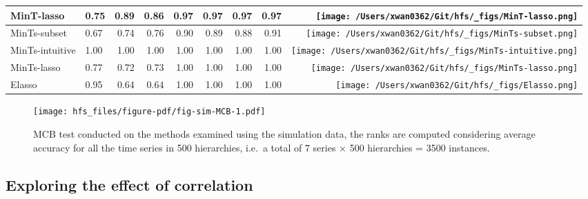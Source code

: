 \documentclass[
  letterpaper,
  DIV=11,
  numbers=noendperiod]{scrartcl}
\begin{document}
\begin{table}[!h]
{\begin{tabular}{llrrrrrr>{}r}
MinT-lasso & 0.75 & 0.89 & 0.86 & 0.97 & 0.97 & 0.97 & 0.97 & \texttt{[image: /Users/xwan0362/Git/hfs/\_figs/MinT-lasso.png]}\\
\midrule
MinTs-subset & 0.67 & 0.74 & 0.76 & 0.90 & 0.89 & 0.88 & 0.91 & \texttt{[image: /Users/xwan0362/Git/hfs/\_figs/MinTs-subset.png]}\\
MinTs-intuitive & 1.00 & 1.00 & 1.00 & 1.00 & 1.00 & 1.00 & 1.00 & \texttt{[image: /Users/xwan0362/Git/hfs/\_figs/MinTs-intuitive.png]}\\
MinTs-lasso & 0.77 & 0.72 & 0.73 & 1.00 & 1.00 & 1.00 & 1.00 & \texttt{[image: /Users/xwan0362/Git/hfs/\_figs/MinTs-lasso.png]}\\
\midrule
Elasso & 0.95 & 0.64 & 0.64 & 1.00 & 1.00 & 1.00 & 1.00 & \texttt{[image: /Users/xwan0362/Git/hfs/\_figs/Elasso.png]}\\
\bottomrule
\end{tabular}}
\end{table}

\begin{figure}

{\centering \texttt{[image: hfs\_files/figure-pdf/fig-sim-MCB-1.pdf]}

}

\caption{\label{fig-sim-MCB}MCB test conducted on the methods examined
using the simulation data, the ranks are computed considering average
accuracy for all the time series in 500 hierarchies, i.e.~a total of 7
series × 500 hierarchies = 3500 instances.}

\end{figure}

\hypertarget{exploring-the-effect-of-correlation}{%
\subsection{Exploring the effect of
correlation}\label{exploring-the-effect-of-correlation}}
\end{document}
